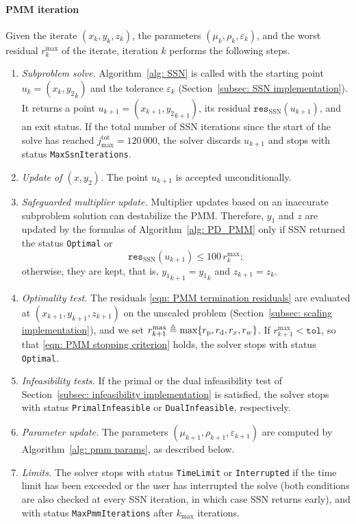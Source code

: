 \paragraph{PMM iteration} Given the iterate $(x_k,y_k,z_k)$, the parameters $(\mu_k,\rho_k,\varepsilon_k)$, and the worst residual $r^{\max}_k$ of the iterate, iteration $k$ performs the following steps.
\begin{enumerate}
    \item \emph{Subproblem solve.} Algorithm~\ref{alg: SSN} is called with the starting point $u_k = (x_k,{y_2}_k)$ and the tolerance $\varepsilon_k$ (Section~\ref{subsec: SSN implementation}). It returns a point $u_{k+1} = (x_{k+1},{y_2}_{k+1})$, its residual $\texttt{res}_{\mathrm{SSN}}(u_{k+1})$, and an exit status. If the total number of SSN iterations since the start of the solve has reached $j_{\max}^{\mathrm{tot}} = 120\,000$, the solver discards $u_{k+1}$ and stops with status \texttt{MaxSsnIterations}.
    \item \emph{Update of $(x,y_2)$.} The point $u_{k+1}$ is accepted unconditionally.
    \item \emph{Safeguarded multiplier update.} Multiplier updates based on an inaccurate subproblem solution can destabilize the PMM. Therefore, $y_1$ and $z$ are updated by the formulas of Algorithm~\ref{alg: PD_PMM} only if SSN returned the status \texttt{Optimal} or
    \begin{equation} \label{eqn: multiplier update safeguard}
        \texttt{res}_{\mathrm{SSN}}(u_{k+1}) \le 100\, r^{\max}_k;
    \end{equation}
    otherwise, they are kept, that is, ${y_1}_{k+1} = {y_1}_k$ and $z_{k+1} = z_k$.
    \item \emph{Optimality test.} The residuals \eqref{eqn: PMM termination residuals} are evaluated at $(x_{k+1},y_{k+1},z_{k+1})$ on the unscaled problem (Section~\ref{subsec: scaling implementation}), and we set $r^{\max}_{k+1} \triangleq \max\{r_{\rm p}, r_{\rm d}, r_x, r_w\}$. If $r^{\max}_{k+1} < \texttt{tol}$, so that \eqref{eqn: PMM stopping criterion} holds, the solver stops with status \texttt{Optimal}.
    \item \emph{Infeasibility tests.} If the primal or the dual infeasibility test of Section~\ref{subsec: infeasibility implementation} is satisfied, the solver stops with status \texttt{PrimalInfeasible} or \texttt{DualInfeasible}, respectively.
    \item \emph{Parameter update.} The parameters $(\mu_{k+1},\rho_{k+1},\varepsilon_{k+1})$ are computed by Algorithm~\ref{alg: pmm params}, as described below.
    \item \emph{Limits.} The solver stops with status \texttt{TimeLimit} or \texttt{Interrupted} if the time limit has been exceeded or the user has interrupted the solve (both conditions are also checked at every SSN iteration, in which case SSN returns early), and with status \texttt{MaxPmmIterations} after $k_{\max}$ iterations.
\end{enumerate}

